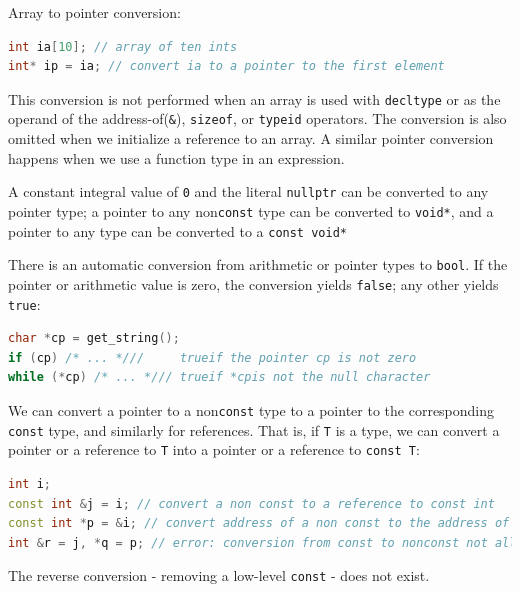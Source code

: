 Array to pointer conversion:
\begin{lstlisting}[language=C++]
int ia[10]; // array of ten ints 
int* ip = ia; // convert ia to a pointer to the first element
\end{lstlisting}
This conversion is not performed when an array is used with \texttt{decltype} or as the operand of the address-of(\texttt{\&}), \texttt{sizeof}, or \texttt{typeid} operators. The conversion is also omitted when we initialize a reference to an array. A similar pointer conversion happens when we use a function type in an expression.

A constant integral value of \texttt{0} and the literal \texttt{nullptr} can be converted to any pointer type; a pointer to any non\texttt{const} type can be converted to \texttt{void*}, and a pointer to any type can be converted to a \texttt{const void*}

There is an automatic conversion from arithmetic or pointer types to \texttt{bool}. If the pointer or arithmetic value is zero, the conversion yields \texttt{false}; any other yields \texttt{true}:
\begin{lstlisting}[language=C++]
char *cp = get_string(); 
if (cp) /* ... *///     trueif the pointer cp is not zero 
while (*cp) /* ... */// trueif *cpis not the null character
\end{lstlisting}

We can convert a pointer to a non\texttt{const} type to a pointer to the corresponding \texttt{const} type, and similarly for references. That is, if \texttt{T} is a type, we can convert a pointer or a  reference to \texttt{T} into a pointer or a reference to \texttt{const T}:
\begin{lstlisting}[language=C++]
int i; 
const int &j = i; // convert a non const to a reference to const int 
const int *p = &i; // convert address of a non const to the address of a const 
int &r = j, *q = p; // error: conversion from const to nonconst not allowed
\end{lstlisting}
The reverse conversion - removing a low-level \texttt{const} - does not exist.
